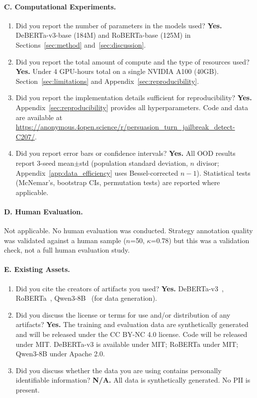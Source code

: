 \paragraph{C. Computational Experiments.}
\begin{enumerate}[label=C\arabic*.,leftmargin=2em]
  \item Did you report the number of parameters in the models used? \textbf{Yes.} DeBERTa-v3-base (184M) and RoBERTa-base (125M) in Sections~\ref{sec:method} and~\ref{sec:discussion}.
  \item Did you report the total amount of compute and the type of resources used? \textbf{Yes.} Under 4 GPU-hours total on a single NVIDIA A100 (40GB). Section~\ref{sec:limitations} and Appendix~\ref{sec:reproducibility}.
  \item Did you report the implementation details sufficient for reproducibility? \textbf{Yes.} Appendix~\ref{sec:reproducibility} provides all hyperparameters. Code and data are available at \url{https://anonymous.4open.science/r/persuasion_turn_jailbreak_detect-C207/}.
  \item Did you report error bars or confidence intervals? \textbf{Yes.} All OOD results report 3-seed mean$\pm$std (population standard deviation, $n$ divisor; Appendix~\ref{app:data_efficiency} uses Bessel-corrected $n{-}1$). Statistical tests (McNemar's, bootstrap CIs, permutation tests) are reported where applicable.
\end{enumerate}

\paragraph{D. Human Evaluation.}
Not applicable. No human evaluation was conducted. Strategy annotation quality was validated against a human sample ($n$=50, $\kappa$=0.78) but this was a validation check, not a full human evaluation study.

\paragraph{E. Existing Assets.}
\begin{enumerate}[label=E\arabic*.,leftmargin=2em]
  \item Did you cite the creators of artifacts you used? \textbf{Yes.} DeBERTa-v3~\citep{he2023debertav3}, RoBERTa~\citep{liu2019roberta}, Qwen3-8B~\citep{qwen3_2025} (for data generation).
  \item Did you discuss the license or terms for use and/or distribution of any artifacts? \textbf{Yes.} The training and evaluation data are synthetically generated and will be released under the CC BY-NC 4.0 license. Code will be released under MIT. DeBERTa-v3 is available under MIT; RoBERTa under MIT; Qwen3-8B under Apache 2.0.
  \item Did you discuss whether the data you are using contains personally identifiable information? \textbf{N/A.} All data is synthetically generated. No PII is present.
\end{enumerate}
